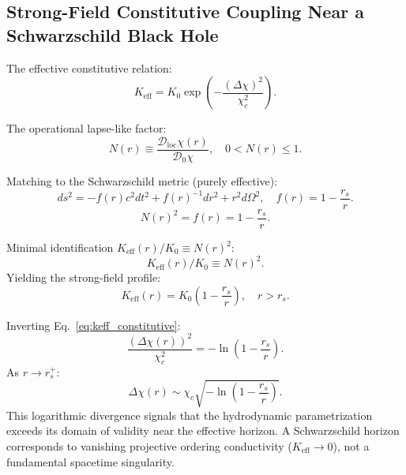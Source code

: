 \subsection{Strong-Field Constitutive Coupling Near a Schwarzschild Black Hole}
  \label{app:keff_schwarzschild}

  The effective constitutive relation:
  \begin{equation}
    K_{\mathrm{eff}}
    = K_0\exp\!\left(
                 -\frac{(\Delta\chi)^2}{\chi_c^2}
    \right).
    \label{eq:keff_constitutive}
  \end{equation}

  The operational lapse-like factor:
  \begin{equation}
    N(r)
    \equiv
    \frac{\mathcal{D}_{\mathrm{loc}}\chi(r)}
    {\mathcal{D}_0\chi},
    \quad 0 < N(r) \le 1.
    \label{eq:lapse_def}
  \end{equation}

  Matching to the Schwarzschild metric (purely effective):
  \begin{equation}
    ds^2 = -f(r)c^2 dt^2 + f(r)^{-1}dr^2
    + r^2 d\Omega^2,
    \quad
    f(r) = 1 - \frac{r_s}{r}.
    \label{eq:schwarzschild_standard}
  \end{equation}
  \begin{equation}
    N(r)^2 = f(r) = 1 - \frac{r_s}{r}.
    \label{eq:lapse_schwarzschild}
  \end{equation}

  Minimal identification
  $K_{\mathrm{eff}}(r)/K_0 \equiv N(r)^2$:
  \begin{equation}
    K_{\mathrm{eff}}(r)/K_0
    \equiv N(r)^2.
    \label{eq:keff_lapse_ansatz}
  \end{equation}
  Yielding the strong-field profile:
  \begin{equation}
    K_{\mathrm{eff}}(r)
    = K_0\!\left(1 - \frac{r_s}{r}\right),
    \quad r > r_s.
    \label{eq:keff_schwarzschild_profile}
  \end{equation}

  Inverting Eq.~\eqref{eq:keff_constitutive}:
  \begin{equation}
    \frac{(\Delta\chi(r))^2}{\chi_c^2}
    = -\ln\!\left(1 - \frac{r_s}{r}\right).
    \label{eq:deltachi_schwarzschild}
  \end{equation}
  As $r \to r_s^+$:
  \begin{equation}
    \Delta\chi(r)
    \sim \chi_c
    \sqrt{-\ln\!\left(
                  1 - \frac{r_s}{r}
    \right)}.
    \label{eq:deltachi_horizon_asymptotic}
  \end{equation}
  This logarithmic divergence signals that the hydrodynamic
  parametrization exceeds its domain of validity near the effective
  horizon.
  A Schwarzschild horizon corresponds to vanishing projective ordering
  conductivity ($K_{\mathrm{eff}} \to 0$), not a fundamental spacetime
  singularity.
